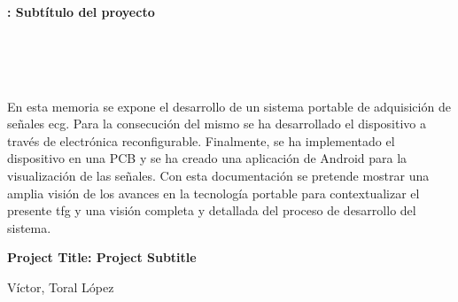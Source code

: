 \chapter*{}



\cleardoublepage
\thispagestyle{empty}

\begin{center}
{\large\bfseries \myTitle: Subtítulo del proyecto}\\
\end{center}
\begin{center}
\myName\\
\end{center}

\\

\vspace{0.7cm}
\\

En esta memoria se expone el desarrollo de un sistema portable de adquisición de señales \acrshort{ecg}. Para la consecución del mismo se ha desarrollado el dispositivo a través de electrónica reconfigurable. Finalmente, se ha implementado el dispositivo en una PCB y se ha creado una aplicación de Android para la visualización de las señales. Con esta documentación se pretende mostrar una amplia visión de los avances en la tecnología portable para contextualizar el presente \acrshort{tfg} y una visión completa y detallada del proceso de desarrollo del sistema. 
\cleardoublepage


\thispagestyle{empty}


\begin{center}
{\large\bfseries Project Title: Project Subtitle}\\
\end{center}
\begin{center}
Víctor, Toral López\\
\end{center}

\\

\vspace{0.7cm}
\\

